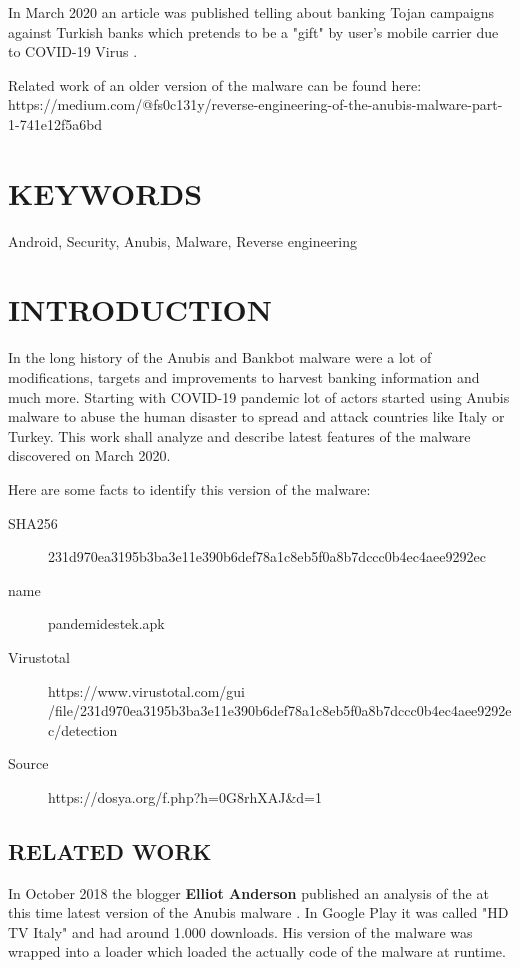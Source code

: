 \documentclass[10pt,titlepage]{article}
\begin{document}
In March 2020 an article was published telling about banking Tojan campaigns against Turkish banks which pretends to be a "gift" by user's mobile carrier due to COVID-19 Virus \cite{COVID19REF}. \cite{ANUBISTURKEY2020} 


Related work of an older version of the malware can be found here: https://medium.com/@fs0c131y/reverse-engineering-of-the-anubis-malware-part-1-741e12f5a6bd

\section{KEYWORDS}
	Android,
    Security,
    Anubis,
    Malware,
    Reverse engineering

\section{INTRODUCTION}
In the long history of the Anubis and Bankbot malware were a lot of modifications, targets and improvements to harvest banking information and much more. Starting with COVID-19 pandemic lot of actors started using Anubis malware to abuse the human disaster to spread and attack countries like Italy or Turkey. This work shall analyze and describe latest features of the malware discovered on March 2020.

Here are some facts to identify this version of the malware:
\begin{description}
\item[SHA256] 231d970ea3195b3ba3e11e390b6def78a1c8eb5f0a8b7dccc0b4ec4aee9292ec
\item[name] pandemidestek.apk
\item[Virustotal] https://www.virustotal.com/gui
\\  /file/231d970ea3195b3ba3e11e390b6def78a1c8eb5f0a8b7dccc0b4ec4aee9292ec/detection
\item[Source] https://dosya.org/f.php?h=0G8rhXAJ\&d=1
\end{description}

\subsection{RELATED WORK}
In October 2018 the blogger \textbf{Elliot Anderson} published an analysis of the at this time latest version of the Anubis malware \cite{REVEANUBIS}. In Google Play it was called "HD TV Italy" and had around 1.000 downloads.
His version of the malware was wrapped into a loader which loaded the actually code of the malware at runtime.
\end{document}
